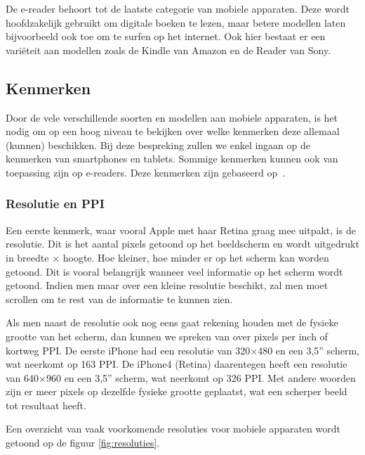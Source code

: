 De e-reader behoort tot de laatste categorie van mobiele apparaten. Deze wordt hoofdzakelijk gebruikt om digitale boeken te lezen, maar betere modellen laten bijvoorbeeld ook toe om te surfen op het internet. Ook hier bestaat er een variëteit aan modellen zoals de Kindle van Amazon en de Reader van Sony.

\subsection{Kenmerken}
Door de vele verschillende soorten en modellen aan mobiele apparaten, is het nodig om op een hoog niveau te bekijken over welke kenmerken deze allemaal (kunnen) beschikken. Bij deze bespreking zullen we enkel ingaan op de kenmerken van smartphones en tablets. Sommige kenmerken kunnen ook van toepassing zijn op e-readers. Deze kenmerken zijn gebaseerd op~\cite{PhilDutson2012}.

\subsubsection{Resolutie en PPI}
Een eerste kenmerk, waar vooral Apple met haar Retina graag mee uitpakt, is de resolutie. Dit is het aantal pixels getoond op het beeldscherm en wordt uitgedrukt in breedte $\times$ hoogte. Hoe kleiner, hoe minder er op het scherm kan worden getoond. Dit is vooral belangrijk wanneer veel informatie op het scherm wordt getoond. Indien men maar over een kleine resolutie beschikt, zal men moet scrollen om te rest van de informatie te kunnen zien.

Als men naast de resolutie ook nog eens gaat rekening houden met de fysieke grootte van het scherm, dan kunnen we spreken van over pixels per inch of kortweg PPI. De eerste iPhone had een resolutie van 320$\times$480 en een 3,5” scherm, wat neerkomt op 163 PPI. De iPhone4 (Retina) daarentegen heeft een resolutie van 640$\times$960 en een 3,5” scherm, wat neerkomt op 326 PPI. Met andere woorden zijn er meer pixels op dezelfde fysieke grootte geplaatst, wat een scherper beeld tot resultaat heeft.

Een overzicht van vaak voorkomende resoluties voor mobiele apparaten wordt getoond op de figuur \ref{fig:resoluties}.

